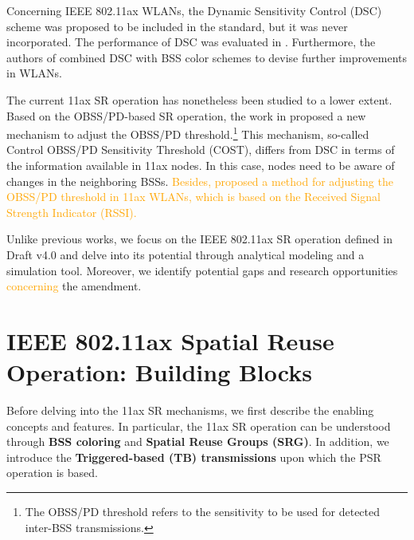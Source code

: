 \documentclass{ieeeaccess}
\begin{document}
Concerning IEEE 802.11ax WLANs, the Dynamic Sensitivity Control (DSC) scheme was proposed to be included in the standard, but it was never incorporated. The performance of DSC was evaluated in \cite{afaqui2015evaluation, afaqui2016dynamic, kulkarni2015taming}. Furthermore, the authors of \cite{selinis2016evaluation, selinis2017exploiting} combined DSC with BSS color schemes to devise further improvements in WLANs.

The current 11ax SR operation has nonetheless been studied to a lower extent. Based on the OBSS/PD-based SR operation, the work in \cite{selinis2018control} proposed a new mechanism to adjust the OBSS/PD threshold.\footnote{The OBSS/PD threshold refers to the sensitivity to be used for detected inter-BSS transmissions.} This mechanism, so-called Control OBSS/PD Sensitivity Threshold (COST), differs from DSC in terms of the information available in 11ax nodes. In this case, nodes need to be aware of changes in the neighboring BSSs. \textcolor{orange}{Besides, \cite{ropitault2018evaluation} proposed a method for adjusting the OBSS/PD threshold in 11ax WLANs, which is based on the Received Signal Strength Indicator (RSSI).}

Unlike previous works, we focus on the IEEE 802.11ax SR operation defined in Draft v4.0 and delve into its potential through analytical modeling and a simulation tool. Moreover, we identify potential gaps and research opportunities \textcolor{orange}{concerning} the amendment.

\section{IEEE 802.11ax Spatial Reuse Operation: Building Blocks}
\label{section:enablers_sr_11ax}
Before delving into the 11ax SR mechanisms, we first describe the enabling concepts and features. In particular, the 11ax SR operation can be understood through \textbf{BSS coloring} and \textbf{Spatial Reuse Groups (SRG)}. In addition, we introduce the \textbf{Triggered-based (TB) transmissions} upon which the PSR operation is based.

\end{document}
